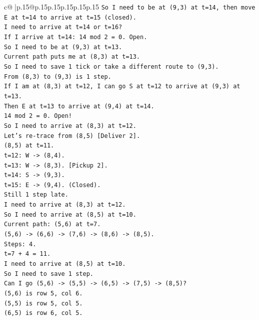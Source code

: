\documentclass{article}
\begin{document}
{\begin{supertabular}{c@{$\;$}|p{.15\linewidth}@{}p{.15\linewidth}p{.15\linewidth}p{.15\linewidth}p{.15\linewidth}p{.15\linewidth}}
{{{\texttt{So I need to be at (9,3) at t=14, then move E at t=14 to arrive at t=15 (closed).} \\
\texttt{I need to arrive at t=14 or t=16?} \\
\texttt{If I arrive at t=14: 14 mod 2 = 0. Open.} \\
\texttt{So I need to be at (9,3) at t=13.} \\
\texttt{Current path puts me at (8,3) at t=13.} \\
\texttt{So I need to save 1 tick or take a different route to (9,3).} \\
\texttt{From (8,3) to (9,3) is 1 step.} \\
\texttt{If I am at (8,3) at t=12, I can go S at t=12 to arrive at (9,3) at t=13.} \\
\texttt{Then E at t=13 to arrive at (9,4) at t=14.} \\
\texttt{14 mod 2 = 0. Open!} \\
\texttt{So I need to arrive at (8,3) at t=12.} \\
\texttt{Let's re{-}trace from (8,5) {[}Deliver 2{]}.} \\
\texttt{(8,5) at t=11.} \\
\texttt{t=12: W {-}> (8,4).} \\
\texttt{t=13: W {-}> (8,3). {[}Pickup 2{]}.} \\
\texttt{t=14: S {-}> (9,3).} \\
\texttt{t=15: E {-}> (9,4). (Closed).} \\
\texttt{Still 1 step late.} \\
\texttt{I need to arrive at (8,3) at t=12.} \\
\texttt{So I need to arrive at (8,5) at t=10.} \\
\texttt{Current path: (5,6) at t=7.} \\
\texttt{(5,6) {-}> (6,6) {-}> (7,6) {-}> (8,6) {-}> (8,5).} \\
\texttt{Steps: 4.} \\
\texttt{t=7 + 4 = 11.} \\
\texttt{I need to arrive at (8,5) at t=10.} \\
\texttt{So I need to save 1 step.} \\
\texttt{Can I go (5,6) {-}> (5,5) {-}> (6,5) {-}> (7,5) {-}> (8,5)?} \\
\texttt{(5,6) is row 5, col 6.} \\
\texttt{(5,5) is row 5, col 5.} \\
\texttt{(6,5) is row 6, col 5.} \\
}}}
\end{supertabular}}
\end{document}
